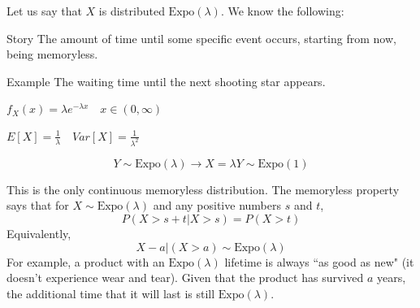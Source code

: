 \documentclass[10pt,landscape]{article}
\newcommand{\Expo}{\textrm{Expo}}
\begin{document}
\begin{multicols*}{3}
    Let us say that $X$ is distributed $\Expo(\lambda)$. We know the following:
    \begin{description}
        \item{Story} The amount of time until some specific event occurs, starting from now, being memoryless. \item{Example} The waiting time until the next shooting star appears.
                                                    
        \item[PDF] $f_X(x) = \lambda e^{-\lambda x} \quad x \in (0, \infty)$ 
        \item[Moments] $E[X]=\frac{1}{\lambda} \quad Var[X] = \frac{1}{\lambda^2}$
        \item[Expos as a rescaled Expo(1)]
        \[Y \sim \Expo(\lambda) \rightarrow X = \lambda Y \sim \Expo(1)\]
                                                     
                                                    
        \item[Memoryless] This is the only continuous memoryless distribution. The memoryless property says that for $X \sim \Expo(\lambda)$ and any positive numbers $s$ and $t$,
        \[P(X > s + t | X > s) = P(X > t)\]
        Equivalently,
        \[X - a | (X > a) \sim \Expo(\lambda)\]
        For example, a product with an $\Expo(\lambda)$ lifetime is always ``as good as new" (it doesn't experience wear and tear). Given that the product has survived $a$ years, the additional time that it will last is still $\Expo(\lambda)$. 
                                                

\end{description}
\end{multicols*}
\end{document}

